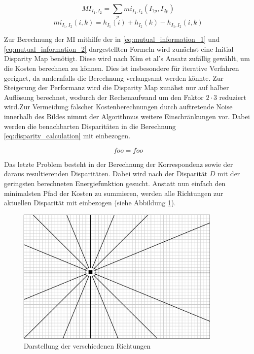 \begin{equation}\label{eq:mutual_information_1}
MI_{I_1,I_2} = \sum_{p} mi_{I_1,I_2}(I_{1p},I_{2p})
\end{equation}
\begin{equation}\label{eq:mutual_information_2}
mi_{I_1,I_2} (i,k) = h_{I_1}(i)+h_{I_2}(k)-h_{I_1,I_2}(i,k)
\end{equation}

\noindent
Zur Berechnung der MI mithilfe der in \ref{eq:mutual_information_1} und \ref{eq:mutual_information_2} dargestellten Formeln wird zunächst eine Initial Disparity Map benötigt. Diese wird nach Kim et al’s \cite{zureiki2008stereo} Ansatz zufällig gewählt, um die Kosten berechnen zu können. Dies ist insbesondere für iterative Verfahren geeignet, da andernfalls die Berechnung verlangsamt werden könnte. Zur Steigerung der Performanz wird die Disparity Map zunähst nur auf halber Auflösung berechnet,  wodurch der Rechenaufwand um den Faktor $2 \cdot 3$ reduziert wird.Zur Vermeidung falscher Kostenberechnungen durch auftretende Noise innerhalb des Bildes nimmt der Algorithmus weitere Einschränkungen vor. Dabei werden die benachbarten Disparitäten in die Berechnung \ref{eq:disparity_calculation} mit einbezogen.

\begin{equation}\label{eq:disparity_calculation}
 foo = foo
\end{equation}

\noindent
Das letzte Problem besteht in der Berechnung der Korrespondenz sowie der daraus resultierenden Disparitäten. Dabei wird nach der Disparität $D$ mit der geringsten berechneten Energiefunktion gesucht. Anstatt nun einfach den minimalsten Pfad der Kosten zu summieren, werden alle Richtungen zur aktuellen Disparität mit einbezogen (siehe Abbildung \ref{fig:sgm_directions}).

\begin{figure}
	\begin{center}
		\includegraphics[width=10cm]{img/sgm_directions.pdf}
	\end{center}
	\caption{Darstellung der verschiedenen Richtungen}
	\label{fig:sgm_directions}
\end{figure}

